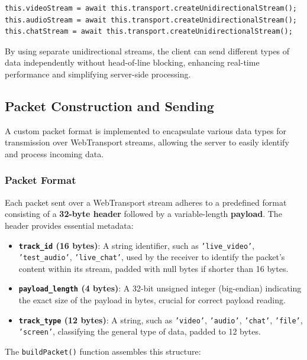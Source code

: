 \begin{lstlisting}[breaklines=true,basicstyle=\small\ttfamily,frame=single]
this.videoStream = await this.transport.createUnidirectionalStream();
this.audioStream = await this.transport.createUnidirectionalStream();
this.chatStream = await this.transport.createUnidirectionalStream();
\end{lstlisting}

By using separate unidirectional streams, the client can send different types of data independently without head-of-line blocking, enhancing real-time performance and simplifying server-side processing.

\subsection{Packet Construction and Sending}
A custom packet format is implemented to encapsulate various data types for transmission over WebTransport streams, allowing the server to easily identify and process incoming data.

\subsubsection{Packet Format}
Each packet sent over a WebTransport stream adheres to a predefined format consisting of a \textbf{32-byte header} followed by a variable-length \textbf{payload}. The header provides essential metadata:

\begin{itemize}
    \item \textbf{\texttt{track\_id} (16 bytes)}: A string identifier, such as \texttt{'live\_video'}, \texttt{'test\_audio'}, \texttt{'live\_chat'}, used by the receiver to identify the packet's content within its stream, padded with null bytes if shorter than 16 bytes.
    \item \textbf{\texttt{payload\_length} (4 bytes)}: A 32-bit unsigned integer (big-endian) indicating the exact size of the payload in bytes, crucial for correct payload reading.
    \item \textbf{\texttt{track\_type} (12 bytes)}: A string, such as \texttt{'video'}, \texttt{'audio'}, \texttt{'chat'}, \texttt{'file'}, \texttt{'screen'}, classifying the general type of data, padded to 12 bytes.
\end{itemize}

The \texttt{buildPacket()} function assembles this structure:

